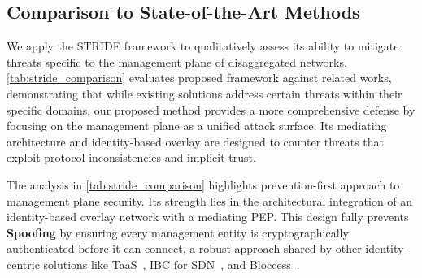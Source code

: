 \documentclass[12pt, a4paper, reqno, oneside]{book}
\begin{document}
\subsection{Comparison to State-of-the-Art Methods}
\label{sec:comparisonSOTA}




We apply the STRIDE framework to qualitatively assess its ability to mitigate threats specific to the management plane of disaggregated networks. \autoref{tab:stride_comparison} evaluates proposed framework against related works, demonstrating that while existing solutions address certain threats within their specific domains, our proposed method provides a more comprehensive defense by focusing on the management plane as a unified attack surface. Its mediating architecture and identity-based overlay are designed to counter threats that exploit protocol inconsistencies and implicit trust.

The analysis in \autoref{tab:stride_comparison} highlights prevention-first approach to management plane security. Its strength lies in the architectural integration of an identity-based overlay network with a mediating PEP. This design fully prevents \textbf{Spoofing} by ensuring every management entity is cryptographically authenticated before it can connect, a robust approach shared by other identity-centric solutions like TaaS~\cite{Erel-Ozcevik2024}, IBC for SDN~\cite{lam2015securing}, and Bloccess~\cite{Ding2022}.
\end{document}
